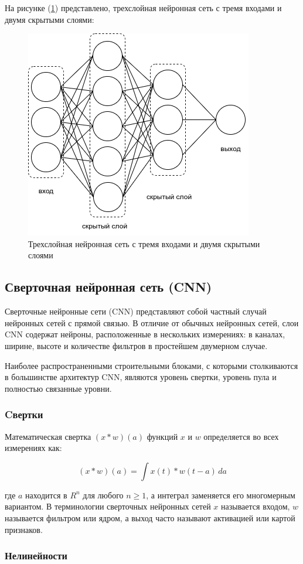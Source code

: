 На рисунке (\ref{fig:neuron-arch}) представлено, трехслойная нейронная сеть с тремя входами и двумя скрытыми слоями: 
\begin{figure}[H]
	\centering
	\includegraphics[width=0.5\linewidth]{images/neural-arch.png}
	\caption{Трехслойная нейронная сеть с тремя входами и двумя скрытыми слоями}
	\label{fig:neuron-arch}
\end{figure}

\subsection{Сверточная нейронная сеть (CNN)}

Сверточные нейронные сети (CNN) представляют собой частный случай нейронных сетей с прямой связью. В отличие от обычных нейронных сетей, слои CNN содержат нейроны, расположенные в нескольких измерениях: в каналах, ширине, высоте и количестве фильтров в простейшем двумерном случае.

Наиболее распространенными строительными блоками, с которыми столкиваются в большинстве архитектур CNN, являются уровень свертки, уровень пула и полностью связанные уровни.

\subsubsection*{Cвертки}

Математическая свертка \((x * w)(a)\) функций \(x\) и \(w\) определяется во всех измерениях как:

\[
    (x * w)(a) = \int x(t) * w (t - a) \, da
\]

где \(a\) находится в \(R^{n}\) для любого \(n \ge 1\), а интеграл заменяется его многомерным вариантом. В терминологии сверточных нейронных сетей \(x\) называется входом, \(w\) называется фильтром или ядром, а выход часто называют активацией или картой признаков.

\subsubsection*{Нелинейности}

